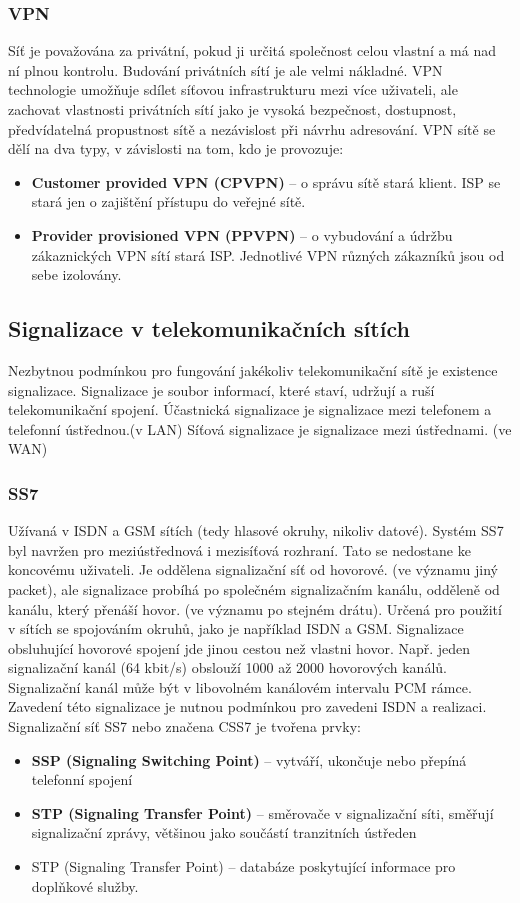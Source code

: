 \subsubsection{VPN}
Síť je považována za privátní, pokud ji určitá společnost celou vlastní a má nad ní plnou kontrolu. Budování privátních sítí je ale velmi nákladné. VPN technologie umožňuje sdílet síťovou infrastrukturu mezi více uživateli, ale zachovat vlastnosti privátních sítí jako je vysoká bezpečnost, dostupnost, předvídatelná propustnost sítě a nezávislost při návrhu adresování. VPN sítě se dělí na dva typy, v závislosti na tom, kdo je provozuje:
\begin{itemize}
\item \textbf{Customer provided VPN (CPVPN)} -- o správu sítě stará klient. ISP se stará jen o zajištění přístupu do veřejné sítě.
\item \textbf{Provider provisioned VPN (PPVPN)} -- o vybudování a údržbu zákaznických VPN sítí stará ISP. Jednotlivé VPN různých zákazníků jsou od sebe izolovány.
\end{itemize}

\subsection{Signalizace v telekomunikačních sítích}
Nezbytnou podmínkou pro fungování jakékoliv telekomunikační sítě je existence signalizace. Signalizace je soubor informací, které staví, udržují a ruší telekomunikační spojení.
Účastnická signalizace je signalizace mezi telefonem a telefonní ústřednou.(v LAN) Síťová signalizace je signalizace mezi ústřednami. (ve WAN)
\subsubsection{SS7}
Užívaná v ISDN a GSM sítích (tedy hlasové okruhy, nikoliv datové). Systém SS7 byl navržen pro meziústřednová i mezisíťová rozhraní. Tato se nedostane ke koncovému uživateli.
Je oddělena signalizační síť od hovorové. (ve významu jiný packet), ale signalizace probíhá po společném signalizačním kanálu, odděleně od kanálu, který přenáší hovor. (ve významu po stejném drátu). Určená pro použití v sítích se spojováním okruhů, jako je například ISDN a GSM. Signalizace obsluhující hovorové spojení jde jinou cestou než vlastni hovor. Např. jeden signalizační kanál (64 kbit/s) obslouží 1000 až 2000 hovorových kanálů. Signalizační kanál může být v libovolném kanálovém intervalu PCM rámce.
Zavedení této signalizace je nutnou podmínkou pro zavedeni ISDN a realizaci. Signalizační síť SS7 nebo značena CSS7 je tvořena prvky:
\begin{itemize}
\item \textbf{SSP (Signaling Switching Point)} -- vytváří, ukončuje nebo přepíná telefonní spojení
\item \textbf{STP (Signaling Transfer Point)} -- směrovače v signalizační síti, směřují signalizační zprávy, většinou jako součástí tranzitních ústředen
\item STP (Signaling Transfer Point) -- databáze poskytující informace pro doplňkové služby.
\end{itemize}

